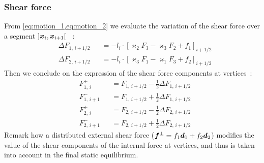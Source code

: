 \subsubsection{Shear force}
From \cref{eq:motion_1,eq:motion_2} we evaluate the variation of the shear force over a segment $]\boldsymbol{x}_{i},  \boldsymbol{x}_{i+1}[$ ~: 
\begin{subequations}
	\begin{alignat}{2}
		&\Delta F_{1,\,i+1/2}^{} &&= - l_i  \cdot {[\varkappa_2 F_3 - \varkappa_3 F_2 + f_1]}_{i+1/2}
		\\
		&\Delta F_{2,\,i+1/2}^{} &&= - l_i  \cdot {[\varkappa_3 F_1 - \varkappa_1 F_3 + f_2]}_{i+1/2}
	\end{alignat}
	\label{eq:DeltaF}
\end{subequations}
Then we conclude on the expression of the shear force components at vertices~:
\begin{subequations}
	\label{eq:dFi}
	\begin{alignat}{2}
		&F_{1,\,i}^{+} &&= F_{1,\,i+1/2} - \frac{1}{2} \Delta F_{1,\,i+1/2}  \\[0.5em]
		&F_{1,\,i+1}^{-} &&= F_{1,\,i+1/2} + \frac{1}{2} \Delta F_{1,\,i+1/2} \\[0.5em]
		&F_{2,\,i}^{+} &&= F_{2,\,i+1/2} - \frac{1}{2} \Delta F_{2,\,i+1/2}  \\[0.5em]
		&F_{2,\,i+1}^{-} &&= F_{2,\,i+1/2} + \frac{1}{2} \Delta F_{2,\,i+1/2}
	\end{alignat}
\end{subequations}
Remark how a distributed external shear force ($\boldsymbol{f}^{\perp} = f_1\boldsymbol{d}_1 + f_2\boldsymbol{d}_2$) modifies the value of the shear components of the internal force at vertices, and thus is taken into account in the final static equilibrium.

